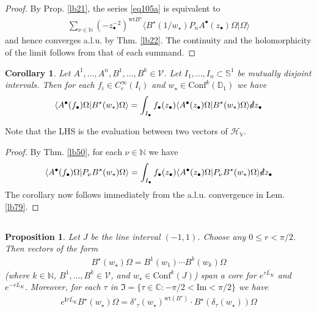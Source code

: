 \documentclass[12pt,b5paper,notitlepage]{article}
\theoremstyle{definition}
\theoremstyle{plain}
\newtheorem{pp}[df]{Proposition}
\newtheorem{co}[df]{Corollary}
\newcommand{\fk}{\mathfrak}
\newcommand{\ovl}{\overline}
\newcommand{\Conf}{\mathrm{Conf}}
\newcommand{\bk}[1]{\langle {#1}\rangle}
\newcommand{\im}{\mathbf{i}}
\newcommand{\blt}{\bullet}
\newcommand{\Cbb}{\mathbb C}
\newcommand{\Nbb}{\mathbb N}
\newcommand{\Dbb}{\mathbb D}
\newcommand{\wt}{\mathrm{wt}}
\newcommand{\Sbb}{{\mathbb S}}
\newcommand{\Imag}{\mathrm{Im}}
\newcommand{\HV}{\mathcal H_{\mathbb V}}
\newcommand{\sd}{\slashed{d}}
\newcommand{\MV}{\mathcal V}
\numberwithin{equation}{section}
\begin{document}
\begin{proof}
By Prop. \ref{lb21}, the series \eqref{eq105a} is equivalent to
\begin{align*}
\sum_{\nu\in\Nbb}(-z_\blt^{-2})^{\wt B^\star}\bk{B^\star(1/w_\star)P_nA^\blt(z_\blt)\Omega|\Omega}
\end{align*}
and hence converges a.l.u. by Thm. \ref{lb22}. The continuity and the holomorphicity of the limit follows from that of each summand.
\end{proof}








\begin{co}\label{lb82}
Let $A^1,\dots,A^n,B^1,\dots,B^k\in\MV$. Let $I_1,\dots,I_n\subset\Sbb^1$ be mutually disjoint intervals. Then  for each $f_i\in C_c^\infty(I_i)$ and $w_\star\in\Conf^k(\Dbb_1)$ we have
\begin{align}
\bk{A^\blt(f_\blt)\Omega|B^\star(w_\star)\Omega}=\int_{I_\blt} f_\blt(z_\blt)\bk{A^\blt(z_\blt)\Omega|B^\star(w_\star)\Omega}\sd z_\blt
\end{align}
\end{co}

Note that the LHS is the evaluation between two vectors of $\HV$.

\begin{proof}
By Thm. \ref{lb50}, for each $\nu\in\Nbb$ we have
\begin{align*}
\bk{A^\blt(f_\blt)\Omega|P_\nu B^\star(w_\star)\Omega}=\int_{I_\blt} f_\blt(z_\blt)\bk{A^\blt(z_\blt)\Omega|P_\nu B^\star(w_\star)\Omega}\sd z_\blt
\end{align*}
The corollary now follows immediately from the a.l.u. convergence in Lem. \ref{lb79}.
\end{proof}


\subsection{}




\begin{pp}\label{lb83}
Let $J$ be the line interval $(-1,1)$. Choose any $0\leq r<\pi/2$. Then vectors of the form
\begin{align}\label{eq106}
B^\star(w_\star)\Omega=B^1(w_1)\cdots B^k(w_k)\Omega
\end{align}
(where $k\in\Nbb$, $B^1,\dots,B^k\in\MV$, and $w_\star\in\Conf^k(J)$) span a core for $e^{r{\ovl{L_K}}}$ and $e^{-r{\ovl{L_K}}}$. Moreover, for each $\tau$ in $\fk I=\{\tau\in\Cbb: -\pi/2<\Imag < \pi/2 \}$ we have
\begin{align}\label{eq107}
e^{\im \tau\ovl{L_K}}B^\star(w_\star)\Omega=\delta'_\tau(w_\star)^{\wt(B^\star)}\cdot B^\star(\delta_\tau(w_\star))\Omega
\end{align}
\end{pp}
\end{document}
